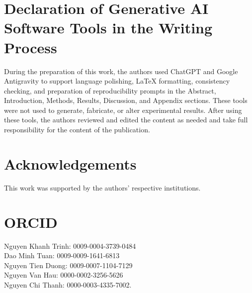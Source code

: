 \documentclass[12pt,a4paper]{jedm}
\begin{document}
\section*{Declaration of Generative AI Software Tools in the Writing Process}
During the preparation of this work, the authors used ChatGPT and Google Antigravity to support language polishing, LaTeX formatting, consistency checking, and preparation of reproducibility prompts in the Abstract, Introduction, Methods, Results, Discussion, and Appendix sections. These tools were not used to generate, fabricate, or alter experimental results. After using these tools, the authors reviewed and edited the content as needed and take full responsibility for the content of the publication.

\section*{Acknowledgements}
This work was supported by the authors' respective institutions.

\section*{ORCID}
\noindent Nguyen Khanh Trinh: 0009-0004-3739-0484\\
\noindent Dao Minh Tuan: 0009-0009-1641-6813\\
\noindent Nguyen Tien Duong: 0009-0007-1104-7129\\
\noindent Nguyen Van Hau: 0000-0002-3256-5626\\
\noindent Nguyen Chi Thanh: 0000-0003-4335-7002.

% 
% 
\end{document}
